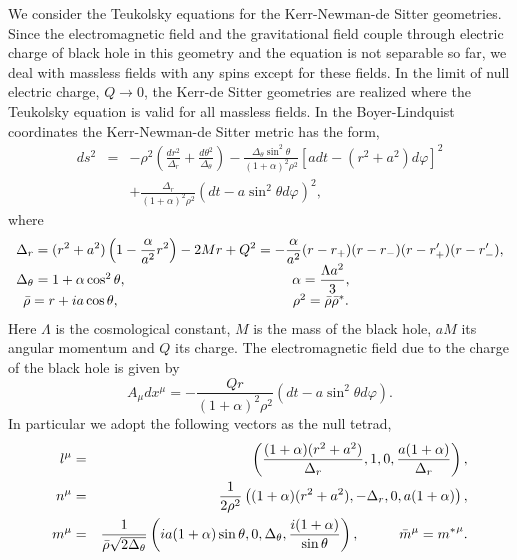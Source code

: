 We consider the Teukolsky equations for the Kerr-Newman-de Sitter 
geometries. Since the electromagnetic field and the gravitational 
field couple through electric charge of black hole in this geometry 
and the equation is not separable so far, we deal with massless 
fields with any spins except for these fields. 
In the limit of null electric charge, $Q \to 0$, 
the Kerr-de Sitter geometries are realized where the Teukolsky 
equation is valid for all massless fields.  
In the Boyer-Lindquist coordinates the Kerr-Newman-de Sitter metric has 
the form,
%
\begin{eqnarray}
ds^2 &=& -\rho^2
\left(\frac{dr^2}{\Delta_r}+\frac{d\theta^2}{\Delta_\theta}\right)
-\frac{\Delta_\theta \sin^2\theta}{(1+\alpha)^2 \rho^2}
[adt-(r^2+a^2)d\varphi]^2 \nonumber \\ 
&&  +\frac{\Delta_r}{(1+\alpha)^2 \rho^2}(dt-a\sin^2\theta d\varphi)^2,
\end{eqnarray}
%
where 
%
\begin{equation}
\begin{array}{cc}
\multicolumn{2}{c}{{\displaystyle 
\Delta_r=(r^2+a^2)\left(1-\frac{\alpha}{a^2}r^2\right)-2Mr+Q^2
=-\frac{\alpha}{a^2}(r-r_+)(r-r_-)(r-r'_+)(r-r'_-),}} \\
\Delta_\theta=1+\alpha\cos^2\theta, &
{\displaystyle \alpha=\frac{\Lambda a^2}{3}}, \\
\bar{\rho}=r+ia\cos\theta, &
\rho^2=\bar{\rho}\bar{\rho}^*. \\
\end{array}
\end{equation}
%
Here $\Lambda$ is the cosmological constant, $M$ is the mass of the black hole, $aM$ its angular momentum and $Q$ its charge.
The electromagnetic field due to the charge of the black hole 
is given by
%
\begin{equation}
A_{\mu}dx^{\mu}
   =-\frac{Qr}{(1+\alpha)^2\rho^2}(dt-a\sin^2\theta d\varphi).
\end{equation}
%
In particular we adopt the following vectors as the null tetrad,
%
\begin{eqnarray}
l^\mu &=& \left(\frac{(1+\alpha)(r^2+a^2)}{\Delta_r}, 1, 0, 
\frac{a(1+\alpha)}{\Delta_r}\right), \nonumber \\
n^\mu &=& \frac{1}{2\rho^2}\left((1+\alpha)(r^2+a^2), -\Delta_r, 0, 
a(1+\alpha)\right), \\
m^\mu &=& \frac{1}{\bar{\rho}\sqrt{2\Delta_\theta}}
\left(ia(1+\alpha)\sin\theta, 0, \Delta_\theta, 
\frac{i(1+\alpha)}{\sin\theta}\right), 
\makebox[1cm]{} \bar{m}^\mu={m^*}^\mu. \nonumber
\end{eqnarray}

